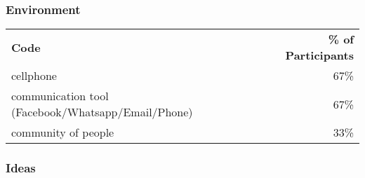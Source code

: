 \subsubsection*{Environment}

\begin{longtable}{p{}r}
\textbf{Code}                                      & \textbf{\% of Participants} \\
cellphone                                          & 67\%                        \\
communication tool (Facebook/Whatsapp/Email/Phone) & 67\%                        \\
community of people                                & 33\%
\end{longtable}

\subsubsection*{Ideas}

